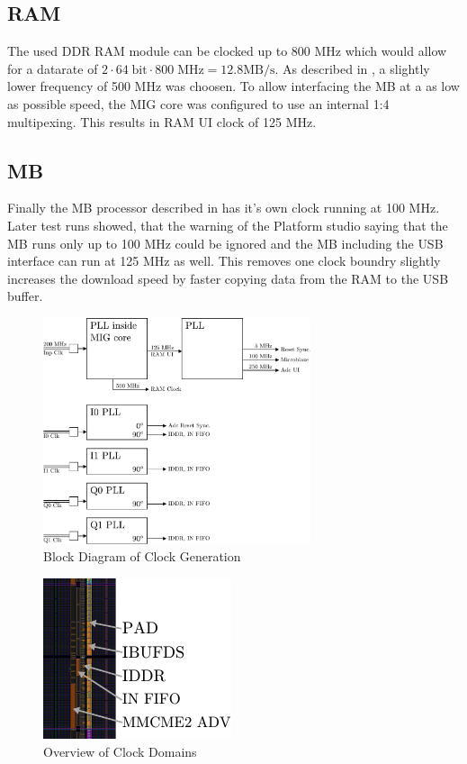 \subsection{\gls{RAM}}
\label{sec:fpga_clock_ram}
The used \gls{DDR} \gls{RAM} module can be clocked up to 800 MHz which would
allow for a datarate of
$2 \cdot 64\;\text{bit} \cdot 800\;\text{MHz} = 12.8 \text{MB} / \text{s}$.
As described in , a slightly lower frequency of 500 MHz
was choosen. To allow interfacing the \gls{MB} at a as low as possible speed,
the \gls{MIG} core was configured to use an internal 1:4 multipexing. This results
in \gls{RAM} \gls{UI} clock of 125 MHz.

\subsection{\acrfull{MB}}
Finally the \gls{MB} processor described in  has
it's own clock running at 100 MHz.  \\

Later test runs showed, that the warning of the Platform studio saying that the
\gls{MB} runs only up to 100 MHz could be ignored and the \gls{MB} including
the \gls{USB} interface can run at 125 MHz as well. This removes one clock boundry
slightly increases the download speed by faster copying data from the
\gls{RAM} to the \gls{USB} buffer.

\begin{figure}
  \centering
  \includegraphics[width=0.7\textwidth]{figures/clock_generation}
  \caption{Block Diagram of Clock Generation}
  \label{fig:fpga_clock_generation}
\end{figure}

\begin{figure}
  \centering
  \includegraphics{figures/adc_input_bank}
  \caption{Overview of Clock Domains}
  \label{fig:fpga_clock_domains}
\end{figure}

